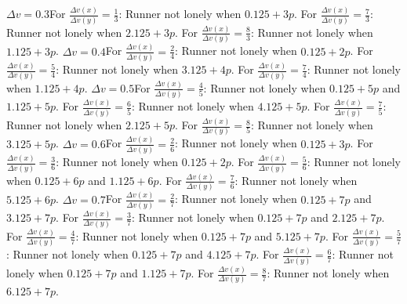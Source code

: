 \documentclass[12pt, a4paper]{article}
\begin{document}
\newline
$\Delta v = 0.3$\newline For $\frac{\Delta v(x)}{\Delta v(y)} = \frac{1}{3}$: Runner not lonely when $0.125+3p$. \newline For $\frac{\Delta v(x)}{\Delta v(y)} = \frac{7}{3}$: Runner not lonely when $2.125+3p$. \newline For $\frac{\Delta v(x)}{\Delta v(y)} = \frac{8}{3}$: Runner not lonely when $1.125+3p$.
\newline
\newline
$\Delta v = 0.4$\newline For $\frac{\Delta v(x)}{\Delta v(y)} = \frac{2}{4}$: Runner not lonely when $0.125+2p$. \newline For $\frac{\Delta v(x)}{\Delta v(y)} = \frac{5}{4}$: Runner not lonely when $3.125+4p$. \newline For $\frac{\Delta v(x)}{\Delta v(y)} = \frac{7}{4}$: Runner not lonely when $1.125+4p$.
\newline
\newline
$\Delta v = 0.5$\newline For $\frac{\Delta v(x)}{\Delta v(y)} = \frac{4}{5}$: Runner not lonely when $0.125+5p$ and $1.125+5p$. \newline For $\frac{\Delta v(x)}{\Delta v(y)} = \frac{6}{5}$: Runner not lonely when $4.125+5p$. \newline For $\frac{\Delta v(x)}{\Delta v(y)} = \frac{7}{5}$: Runner not lonely when $2.125+5p$. \newline For $\frac{\Delta v(x)}{\Delta v(y)} = \frac{8}{5}$: Runner not lonely when $3.125+5p$.
\newline
\newline
$\Delta v = 0.6$\newline For $\frac{\Delta v(x)}{\Delta v(y)} = \frac{2}{6}$: Runner not lonely when $0.125+3p$. \newline For $\frac{\Delta v(x)}{\Delta v(y)} = \frac{3}{6}$: Runner not lonely when $0.125+2p$. \newline For $\frac{\Delta v(x)}{\Delta v(y)} = \frac{5}{6}$: Runner not lonely when $0.125+6p$ and $1.125+6p$. \newline For $\frac{\Delta v(x)}{\Delta v(y)} = \frac{7}{6}$: Runner not lonely when $5.125+6p$.
\newline
\newline
$\Delta v = 0.7$\newline For $\frac{\Delta v(x)}{\Delta v(y)} = \frac{2}{7}$: Runner not lonely when $0.125+7p$ and $3.125+7p$. \newline For $\frac{\Delta v(x)}{\Delta v(y)} = \frac{3}{7}$: Runner not lonely when $0.125+7p$ and $2.125+7p$. \newline For $\frac{\Delta v(x)}{\Delta v(y)} = \frac{4}{7}$: Runner not lonely when $0.125+7p$ and $5.125+7p$. \newline For $\frac{\Delta v(x)}{\Delta v(y)} = \frac{5}{7}$: Runner not lonely when $0.125+7p$ and $4.125+7p$. \newline For $\frac{\Delta v(x)}{\Delta v(y)} = \frac{6}{7}$: Runner not lonely when $0.125+7p$ and $1.125+7p$. \newline For $\frac{\Delta v(x)}{\Delta v(y)} = \frac{8}{7}$: Runner not lonely when $6.125+7p$.
\end{document}
